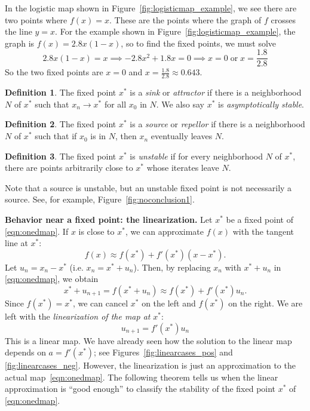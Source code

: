 \documentclass[reqno]{immbook}
\numberwithin{equation}{chapter}
\numberwithin{question}{section}
\numberwithin{theorem}{chapter}
\numberwithin{figure}{chapter}
\theoremstyle{definition}
\newtheorem{definition}{Definition}[section]
\begin{document}
In the logistic map shown in Figure~\ref{fig:logisticmap_example},
we see there are two
points where $f(x)=x$.  These are the points
where the graph of $f$ crosses the line $y=x$.
For the example shown in Figure~\ref{fig:logisticmap_example},
the graph is $f(x) = 2.8x(1-x)$, so to find the fixed points,
we must solve
\begin{equation}
  2.8x(1-x) = x \implies -2.8x^2 + 1.8x = 0
  \implies x = 0 \;\textrm{or}\; x = \frac{1.8}{2.8}
\end{equation}
So the two fixed points are $x=0$ and $x=\frac{1.8}{2.8}\approx 0.643$.

\begin{definition}
The fixed point $x^*$ is a \emph{sink} or \emph{attractor}
if there is a neighborhood $N$ of $x^*$ such that
$x_n\rightarrow x^*$ for all $x_0$ in $N$.
We also say $x^*$ is \emph{asymptotically stable}.
\end{definition}
\begin{definition}
The fixed point $x^*$ is a \emph{source} or \emph{repellor}
if there is a neighborhood $N$ of $x^*$ such that if $x_0$
is in $N$, then $x_n$ eventually leaves $N$.
\end{definition}
\begin{definition}
The fixed point $x^*$ is \emph{unstable} if for every
neighborhood $N$ of $x^*$, there are points arbitrarily close
to $x^*$ whose iterates leave $N$.
\end{definition}

\vspace{0.2cm}
Note that a source is unstable, but an unstable fixed point
is not necessarily a source.  See, for example,
Figure~\ref{fig:noconclusion1}.

\noindent
\textbf{Behavior near a fixed point: the linearization.}
Let $x^*$ be a fixed point of \eqref{eqn:onedmap}.
If $x$ is close to $x^*$,
we can approximate $f(x)$ with the tangent line at $x^*$:
\begin{equation}
   f(x) \approx f(x^*) + f'(x^*)(x-x^*).
\end{equation}
Let $u_n = x_n-x^*$ (i.e. $x_n = x^* + u_n$).
Then, by replacing $x_n$ with $x^*+u_n$
in \eqref{eqn:onedmap}, we obtain
\begin{equation}
  x^* + u_{n+1} = f(x^*+u_n) \approx f(x^*)+f'(x^*)u_n.
\end{equation}
Since $f(x^*)=x^*$, we can cancel $x^*$ on the left
and $f(x^*)$ on the right.
We are left with the
\emph{linearization of the map at } $x^*$:
\begin{equation}
  u_{n+1} = f'(x^*)u_n
\end{equation}
This is a linear map.
We have already seen how the solution to the linear
map depends on $a=f'(x^*)$; see Figures~\ref{fig:linearcases_pos}
and \ref{fig:linearcases_neg}.
However, the linearization is just an approximation
to the actual map~\eqref{eqn:onedmap}.
The following theorem tells us when the linear approximation
is ``good enough'' to classify the stability of the
fixed point $x^*$ of \eqref{eqn:onedmap}.
\end{document}
